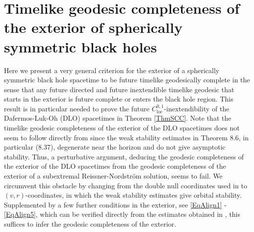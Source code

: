 \documentclass[reqno]{article}
\newcommand{\loc}{\mathrm{loc}}
\begin{document}
\appendix

\section{Timelike geodesic completeness of the exterior of spherically symmetric black holes} 

Here we present a very general criterion for the exterior of a spherically symmetric black hole spacetime to be future timelike geodesically complete in the sense that any future directed and future inextendible timelike geodesic that starts in the exterior is  future complete or enters the black hole region. This result is in particular needed to prove the future $C^{0,1}_{\loc}$-inextendibility of the Dafermos-Luk-Oh (DLO) spacetimes in Theorem \ref{ThmSCC}. Note that the timelike geodesic completeness of the exterior of the DLO spacetimes does not seem to follow directly from \cite{LukOh19II} since the weak stability estimates in Theorem 8.6, in particular (8.37), degenerate near the horizon and do not give asymptotic stability. Thus, a perturbative argument, deducing the geodesic completeness of the exterior of the DLO spacetimes from the geodesic completeness of the exterior of a subextremal Reissner-Nordstr\"om solution, seems to fail. We circumvent this obstacle by changing from the double null coordinates used in \cite{LukOh19II} to $(v,r)$-coordinates, in which the weak stability estimates give orbital stability. Supplemented by a few further conditions in the exterior, see \eqref{EqAlign1} - \eqref{EqAlign5}, which can be verified directly from the estimates obtained in \cite{LukOh19II}, this suffices to infer the geodesic completeness of the exterior.
\newline
\end{document}
